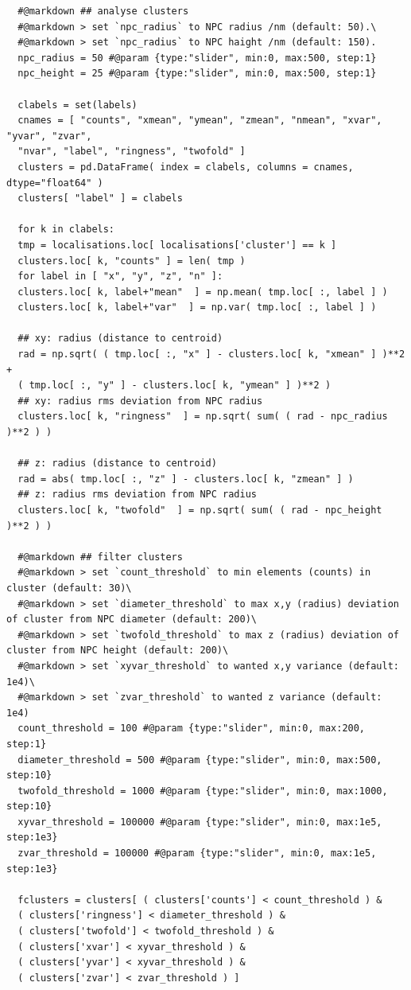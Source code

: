 \documentclass[11pt, a4paper, oneside, twocolumn]{report}
\begin{document}
\begin{verbatim}
  #@markdown ## analyse clusters
  #@markdown > set `npc_radius` to NPC radius /nm (default: 50).\
  #@markdown > set `npc_radius` to NPC haight /nm (default: 150).
  npc_radius = 50 #@param {type:"slider", min:0, max:500, step:1}
  npc_height = 25 #@param {type:"slider", min:0, max:500, step:1}

  clabels = set(labels)
  cnames = [ "counts", "xmean", "ymean", "zmean", "nmean", "xvar", "yvar", "zvar",
  "nvar", "label", "ringness", "twofold" ]
  clusters = pd.DataFrame( index = clabels, columns = cnames, dtype="float64" )
  clusters[ "label" ] = clabels

  for k in clabels:
  tmp = localisations.loc[ localisations['cluster'] == k ]
  clusters.loc[ k, "counts" ] = len( tmp )
  for label in [ "x", "y", "z", "n" ]:
  clusters.loc[ k, label+"mean"  ] = np.mean( tmp.loc[ :, label ] )
  clusters.loc[ k, label+"var"  ] = np.var( tmp.loc[ :, label ] )

  ## xy: radius (distance to centroid)
  rad = np.sqrt( ( tmp.loc[ :, "x" ] - clusters.loc[ k, "xmean" ] )**2 + 
  ( tmp.loc[ :, "y" ] - clusters.loc[ k, "ymean" ] )**2 )
  ## xy: radius rms deviation from NPC radius
  clusters.loc[ k, "ringness"  ] = np.sqrt( sum( ( rad - npc_radius )**2 ) )

  ## z: radius (distance to centroid)
  rad = abs( tmp.loc[ :, "z" ] - clusters.loc[ k, "zmean" ] )
  ## z: radius rms deviation from NPC radius
  clusters.loc[ k, "twofold"  ] = np.sqrt( sum( ( rad - npc_height )**2 ) )

  #@markdown ## filter clusters
  #@markdown > set `count_threshold` to min elements (counts) in cluster (default: 30)\
  #@markdown > set `diameter_threshold` to max x,y (radius) deviation of cluster from NPC diameter (default: 200)\
  #@markdown > set `twofold_threshold` to max z (radius) deviation of cluster from NPC height (default: 200)\
  #@markdown > set `xyvar_threshold` to wanted x,y variance (default: 1e4)\
  #@markdown > set `zvar_threshold` to wanted z variance (default: 1e4)
  count_threshold = 100 #@param {type:"slider", min:0, max:200, step:1}
  diameter_threshold = 500 #@param {type:"slider", min:0, max:500, step:10}
  twofold_threshold = 1000 #@param {type:"slider", min:0, max:1000, step:10}
  xyvar_threshold = 100000 #@param {type:"slider", min:0, max:1e5, step:1e3}
  zvar_threshold = 100000 #@param {type:"slider", min:0, max:1e5, step:1e3}

  fclusters = clusters[ ( clusters['counts'] < count_threshold ) &
  ( clusters['ringness'] < diameter_threshold ) &
  ( clusters['twofold'] < twofold_threshold ) &
  ( clusters['xvar'] < xyvar_threshold ) & 
  ( clusters['yvar'] < xyvar_threshold ) &
  ( clusters['zvar'] < zvar_threshold ) ]
\end{verbatim}
\end{document}
